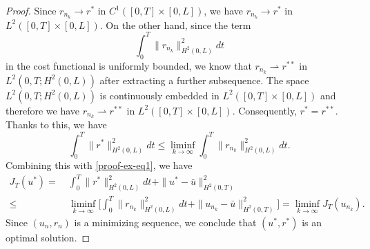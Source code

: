 \documentclass[12pt]{article}
\numberwithin{equation}{section}
\begin{document}
\begin{proof}
Since $r_{n_k} \rightarrow r^{*}$ in $C^1([0,T]\times [0,L])$, we have $r_{n_k} \rightarrow r^{*}$ in $L^2([0,T]\times [0,L])$. On the other hand, since the term $$\int_0^T\| r_{n_k}\|^2_{H^2(0,L)}dt$$ in the cost functional is uniformly bounded, we know that $r_{n_k} \rightharpoonup r^{**}$ in $L^2(0,T; H^2(0,L))$ after extracting a further subsequence. The space $L^2(0,T; H^2(0,L))$ is continuously embedded in $L^2([0,T]\times [0,L])$ and therefore we have $r_{n_k} \rightharpoonup r^{**}$ in $L^2([0,T]\times [0,L])$. Consequently, $r^*=r^{**}$.
Thanks to this, we have 
$$
\int_0^T \|r^* \|^2_{H^2(0,L)} dt  \leq  \liminf_{k\rightarrow \infty} \int_0^T\| r_{n_k}\|^2_{H^2(0,L)}dt.
$$
Combining this with \eqref{proof-ex-eq1}, we have
\begin{align*}
J_T(u^*)=&~\int_0^T \|r^* \|^2_{H^2(0,L)} dt+\|u^*-\bar{u}\|_{H^2(0,T)}^2 \\[2mm]
\leq &~ \liminf_{k\rightarrow \infty} \Big[\int_0^T \|r_{n_k} \|^2_{H^2(0,L)} dt + \|u_{n_k}-\bar{u}\|_{H^2(0,T)}^2\Big]=\liminf_{k\rightarrow \infty}J_T(u_{n_k}).
\end{align*}
Since $(u_n,r_n)$ is a minimizing sequence, we conclude that $(u^*,r^*)$ is an optimal solution.

\end{proof}
\end{document}
